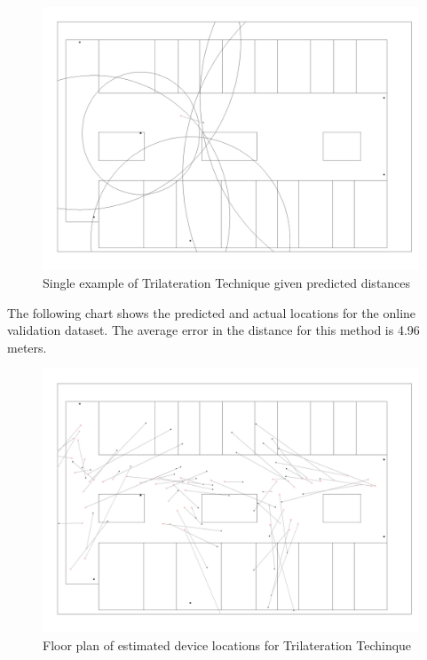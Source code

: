 \documentclass[12pt, conference]{IEEEtran}
\begin{document}
\begin{figure}[htbp]
  \centerline{\includegraphics[width=\columnwidth]{img/circles_real4.png}}
  \caption{Single example of Trilateration Technique given predicted distances}
  \label{fig: Distance Comparison}
\end{figure}

The following chart shows the predicted and actual locations for the online validation dataset. The average error in the distance for this method is 4.96 meters.

\begin{figure}[htbp]
  \centerline{\includegraphics[width=\columnwidth]{img/Multilateration_Error.png}}
  \caption{Floor plan of estimated device locations for Trilateration Techinque}
  \label{fig: Trilateration Floor Plan}
\end{figure}
\end{document}
